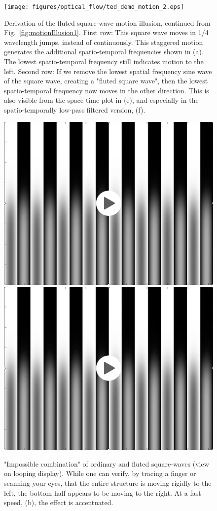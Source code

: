 \begin{figure}
    \centerline{
        \texttt{[image: figures/optical\_flow/ted\_demo\_motion\_2.eps]}
    }
    \caption{Derivation of the fluted square-wave motion illusion, continued from Fig.~\ref{fig:motionIllusion1}.  First row:  This square wave moves in 1/4 wavelength jumps, instead of continuously.  This staggered motion generates the additional spatio-temporal frequencies shown in (a).  The lowest spatio-temporal frequency still indicates motion to the left.  Second row:  If we remove the lowest spatial frequency sine wave of the square wave, creating a "fluted square wave", then the lowest spatio-temporal frequency now moves in the other direction.  This is also visible from the space time plot in (e), and especially in the spatio-temporally low-pass filtered version, (f).}
    \label{fig:motionIllusion2}
\end{figure}



\begin{figure}
    \centerline{
        {
            \href{https://groups.csail.mit.edu/vision/cvbook/videos/blendedSlowLoop.mov}{\includegraphics[width=0.5\linewidth]{figures/temporal_filters/blendFrame.jpg}}}
        {
            \href{https://groups.csail.mit.edu/vision/cvbook/videos/fastBlendLoop.mov}{\includegraphics[width=0.5\linewidth]{figures/temporal_filters/blendFrame.jpg}}}
    }
    \caption{"Impossible combination" of ordinary and  fluted square-waves (view on looping display).  While one can verify, by tracing a finger or scanning your eyes, that the entire structure is moving rigidly to the left, the bottom half appears to be moving to the right.  At a fast speed, (b), the effect is accentuated.}
    \label{fig:blends}
\end{figure}




